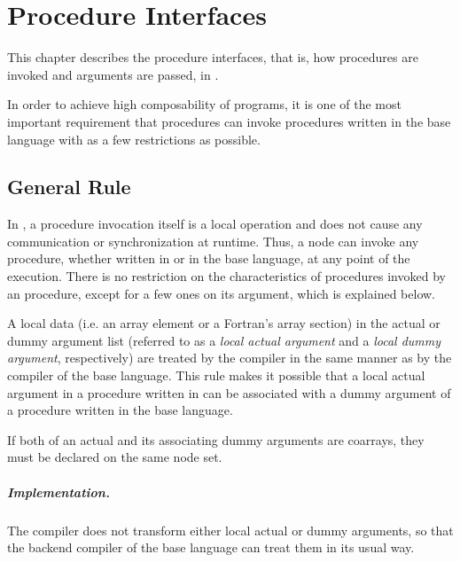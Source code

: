 \chapter{Procedure Interfaces}
\label{chap:procedure}

This chapter describes the procedure interfaces, that is, how
procedures are invoked and arguments are passed, in {\XMP}.

In order to achieve high composability of {\XMP} programs, it is one of
the most important requirement that {\XMP} procedures can invoke
procedures written in the base language with as a few restrictions as
possible.


\section{General Rule}

In {\XMP}, a procedure invocation itself is a local operation and does
not cause any communication or synchronization at runtime. Thus, a node
can invoke any procedure, whether written in {\XMP} or in the base
language, at any point of the execution.
%
There is no restriction on the characteristics of procedures invoked by
an {\XMP} procedure, except for a few ones on its argument, which is
explained below.

A local data (i.e. an array element or a Fortran's array section) in the
actual or dummy argument list (referred to as a {\it local actual
argument} and a {\it local dummy argument}, respectively) are treated by
the {\XMP} compiler in the same manner as by the compiler of the base
language.
%
This rule makes it possible that a local actual argument in a procedure
written in {\XMP} can be associated with a dummy argument of a procedure
written in the base language.

If both of an actual and its associating dummy arguments are coarrays,
they must be declared on the same node set.


\paragraph{Implementation.}

The {\XMP} compiler does not transform either local actual or dummy
arguments, so that the backend compiler of the base language can treat
them in its usual way.

